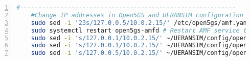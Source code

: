 \begin{lstlisting}[basicstyle=\small, frame=single, breaklines=true, postbreak=\mbox{\textcolor{red}{$\hookrightarrow$}\space}, escapeinside ={\%,}, escapechar={!}, numbers=left, language=sh, caption=Script]
    #-----------------------------------------------------------
    #Change IP addresses in Open5GS and UERANSIM configuration files
    sudo sed -i '23s/127.0.0.5/10.0.2.15/' /etc/open5gs/amf.yaml # Change AMF IP address
    sudo systemctl restart open5gs-amfd # Restart AMF service to apply changes
    sudo sed -i 's/127.0.0.1/10.0.2.15/' ~/UERANSIM/config/open5gs-ue.yaml # Change UE IP address
    sudo sed -i 's/127.0.0.1/10.0.2.15/' ~/UERANSIM/config/open5gs-gnb.yaml # Change gNB IP address
    sudo sed -i 's/127.0.0.5/10.0.2.15/' ~/UERANSIM/config/open5gs-gnb.yaml # Change gNB AMF IP address
\end{lstlisting}